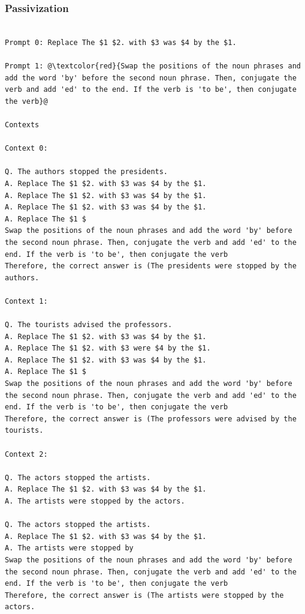 \documentclass{article} %
\begin{document}
\subsubsection{Passivization}
\begin{tcolorbox}
\begin{lstlisting}[escapechar=@]

Prompt 0: Replace The $1 $2. with $3 was $4 by the $1.

Prompt 1: @\textcolor{red}{Swap the positions of the noun phrases and add the word 'by' before the second noun phrase. Then, conjugate the verb and add 'ed' to the end. If the verb is 'to be', then conjugate the verb}@

Contexts

Context 0:

Q. The authors stopped the presidents.
A. Replace The $1 $2. with $3 was $4 by the $1.
A. Replace The $1 $2. with $3 was $4 by the $1.
A. Replace The $1 $2. with $3 was $4 by the $1.
A. Replace The $1 $
Swap the positions of the noun phrases and add the word 'by' before the second noun phrase. Then, conjugate the verb and add 'ed' to the end. If the verb is 'to be', then conjugate the verb
Therefore, the correct answer is (The presidents were stopped by the authors.

Context 1:

Q. The tourists advised the professors.
A. Replace The $1 $2. with $3 was $4 by the $1.
A. Replace The $1 $2. with $3 were $4 by the $1.
A. Replace The $1 $2. with $3 was $4 by the $1.
A. Replace The $1 $
Swap the positions of the noun phrases and add the word 'by' before the second noun phrase. Then, conjugate the verb and add 'ed' to the end. If the verb is 'to be', then conjugate the verb
Therefore, the correct answer is (The professors were advised by the tourists.

Context 2:

Q. The actors stopped the artists.
A. Replace The $1 $2. with $3 was $4 by the $1.
A. The artists were stopped by the actors.

Q. The actors stopped the artists.
A. Replace The $1 $2. with $3 was $4 by the $1.
A. The artists were stopped by
Swap the positions of the noun phrases and add the word 'by' before the second noun phrase. Then, conjugate the verb and add 'ed' to the end. If the verb is 'to be', then conjugate the verb
Therefore, the correct answer is (The artists were stopped by the actors.

\end{lstlisting}
\end{tcolorbox}
\end{document}
